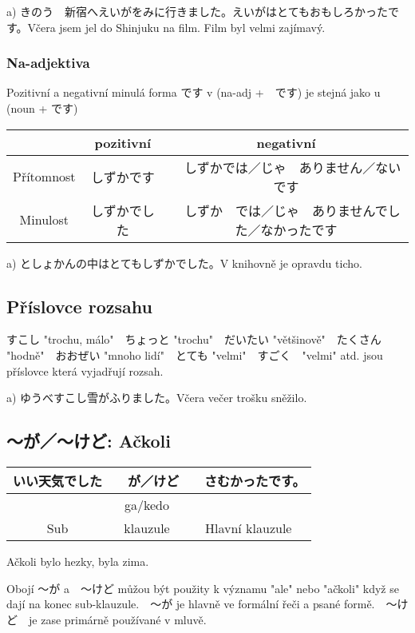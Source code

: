 a) きのう　新宿へえいがをみに行きました。えいがはとてもおもしろかったです。Včera jsem jel do Shinjuku na film. Film byl velmi zajímavý.

\subsubsection{Na-adjektiva}
Pozitivní a negativní minulá forma です v (na-adj +　です) je stejná jako u (noun + です)

\begin{center}
\begin{tabular}{|c|c|c|}
\hline
&pozitivní & negativní\\
\hline
Přítomnost &しずかです&　しずかでは／じゃ　ありません／ないです\\
\hline
Minulost&しずかでした&　しずか　では／じゃ　ありませんでした／なかったです\\
\hline
\end{tabular}
\end{center}

a) としょかんの中はとてもしずかでした。V knihovně je opravdu ticho.

\subsection{Příslovce rozsahu}
すこし "trochu, málo"　ちょっと "trochu"　だいたい "většinově"　たくさん "hodně"　おおぜい "mnoho lidí"　とても "velmi"　すごく　"velmi" atd. jsou příslovce která vyjadřují rozsah.

a) ゆうべすこし雪がふりました。Včera večer trošku sněžilo.

\subsection{〜が／〜けど: Ačkoli}

\begin{center}
\begin{tabular}{|c|c|c|}
\hline
いい天気でした&　が／けど&　さむかったです。\\
\hline
&ga/kedo&\\
Sub&klauzule&Hlavní klauzule\\
\hline
\end{tabular}
\end{center}
Ačkoli bylo hezky, byla zima.

Obojí 〜が a　〜けど můžou být použity k významu "ale" nebo "ačkoli" když se dají na konec sub-klauzule.　〜が je hlavně ve formální řeči a psané formě.　〜けど　je zase primárně používané v mluvě.

